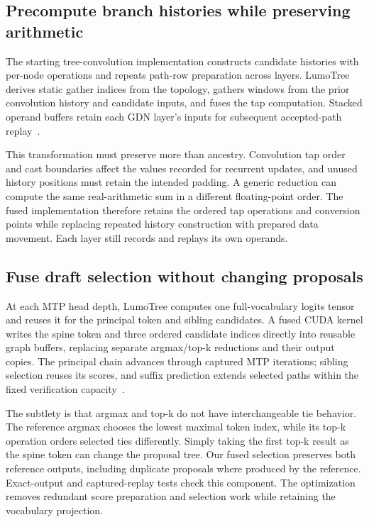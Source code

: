 \documentclass[conference]{IEEEtran}
\newcommand{\sys}{LumoTree}
\begin{document}
\subsection{Precompute branch histories while preserving arithmetic}
The starting tree-convolution implementation constructs candidate histories with per-node operations and repeats path-row preparation across layers. \sys{} derives static gather indices from the topology, gathers windows from the prior convolution history and candidate inputs, and fuses the tap computation. Stacked operand buffers retain each GDN layer's inputs for subsequent accepted-path replay~\cite{lumo2026archive}.

This transformation must preserve more than ancestry. Convolution tap order and cast boundaries affect the values recorded for recurrent updates, and unused history positions must retain the intended padding. A generic reduction can compute the same real-arithmetic sum in a different floating-point order. The fused implementation therefore retains the ordered tap operations and conversion points while replacing repeated history construction with prepared data movement. Each layer still records and replays its own operands.

\subsection{Fuse draft selection without changing proposals}
At each MTP head depth, \sys{} computes one full-vocabulary logits tensor and reuses it for the principal token and sibling candidates. A fused CUDA kernel writes the spine token and three ordered candidate indices directly into reusable graph buffers, replacing separate argmax/top-k reductions and their output copies. The principal chain advances through captured MTP iterations; sibling selection reuses its scores, and suffix prediction extends selected paths within the fixed verification capacity~\cite{lumo2026archive}.

The subtlety is that argmax and top-k do not have interchangeable tie behavior. The reference argmax chooses the lowest maximal token index, while its top-k operation orders selected ties differently. Simply taking the first top-k result as the spine token can change the proposal tree. Our fused selection preserves both reference outputs, including duplicate proposals where produced by the reference. Exact-output and captured-replay tests check this component. The optimization removes redundant score preparation and selection work while retaining the vocabulary projection.
\end{document}
